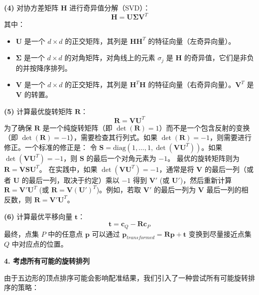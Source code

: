 \textbf{(4)} 对协方差矩阵 $\mathbf{H}$ 进行奇异值分解（SVD）：
\begin{equation}
    \mathbf{H} = \mathbf{U}\bm{\Sigma} \mathbf{V}^T
\end{equation}
其中：
\begin{itemize}
    \item $\mathbf{U}$ 是一个 $d \times d$ 的正交矩阵，其列是 $\mathbf{H}\mathbf{H}^T$ 的特征向量（左奇异向量）。
    \item $\bm{\Sigma}$ 是一个 $d \times d$ 的对角矩阵，对角线上的元素 $\sigma_j$ 是 $\mathbf{H}$ 的奇异值，它们是非负的并按降序排列。
    \item $\mathbf{V}$ 是一个 $d \times d$ 的正交矩阵，其列是 $\mathbf{H}^T\mathbf{H}$ 的特征向量（右奇异向量）。$\mathbf{V}^T$ 是 $\mathbf{V}$ 的转置。
\end{itemize}

\textbf{(5)} 计算最优旋转矩阵 $\mathbf{R}$：
\begin{equation}
    \mathbf{R} = \mathbf{V} \mathbf{U}^T
\end{equation}
为了确保 $\mathbf{R}$ 是一个纯旋转矩阵（即 $\det(\mathbf{R}) = 1$）而不是一个包含反射的变换（即 $\det(\mathbf{R}) = -1$），需要检查其行列式。如果 $\det(\mathbf{R}) = -1$，则需要进行修正。一个标准的修正是：
令 $\mathbf{S} = \mathrm{diag}(1, \dots, 1, \det(\mathbf{V}\mathbf{U}^T))$。如果 $\det(\mathbf{V}\mathbf{U}^T) = -1$，则 $\mathbf{S}$ 的最后一个对角元素为 $-1$。
最优的旋转矩阵则为 $\mathbf{R} = \mathbf{V} \mathbf{S} \mathbf{U}^T$。
在实践中，如果 $\det(\mathbf{V}\mathbf{U}^T) = -1$，通常是将 $\mathbf{V}$ 的最后一列（或者 $\mathbf{U}$ 的最后一列，取决于约定）乘以 $-1$ 得到 $\mathbf{V}'$ (或 $\mathbf{U}'$)，然后重新计算 $\mathbf{R} = \mathbf{V}' \mathbf{U}^T$ (或 $\mathbf{R} = \mathbf{V} (\mathbf{U}')^T$)。例如，若取 $\mathbf{V}'$ 的最后一列为 $\mathbf{V}$ 最后一列的相反数，则 $\mathbf{R} = \mathbf{V}' \mathbf{U}^T$。

\textbf{(6)} 计算最优平移向量 $\mathbf{t}$：
\begin{equation}
    \mathbf{t} = \mathbf{c}_Q - \mathbf{R}\mathbf{c}_P
\end{equation}
最终，点集 $P$ 中的任意点 $\mathbf{p}$ 可以通过 $\mathbf{p}_{transformed} = \mathbf{R}\mathbf{p} + \mathbf{t}$ 变换到尽量接近点集 $Q$ 中对应点的位置。
    
    \textbf{4. 考虑所有可能的旋转排列}
    
    由于五边形的顶点排序可能会影响配准结果，我们引入了一种尝试所有可能旋转排序的策略：
    
